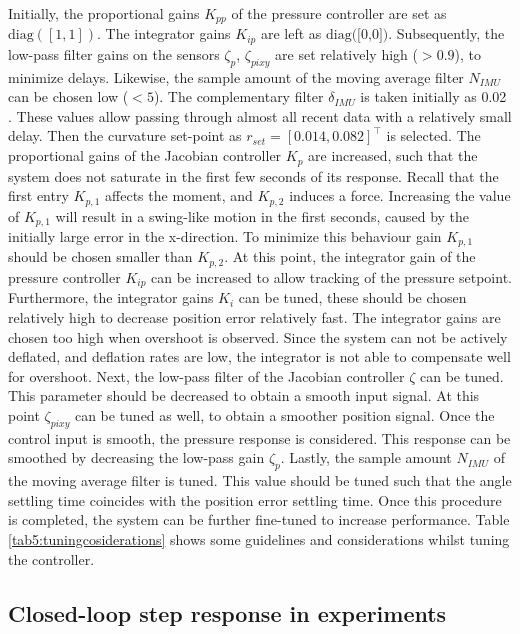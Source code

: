 Initially, the proportional gains $K_{pp}$ of the pressure controller are set as $\text{diag}([1,1])$. The integrator gains $K_{ip}$ are left as $\text{diag([0,0])}$. Subsequently, the low-pass filter gains on the sensors $\zeta_p$, $\zeta_{pixy}$ are set relatively high ($>0.9$), to minimize delays. Likewise, the sample amount of the moving average filter $N_{IMU}$ can be chosen low ($<5$). The complementary filter $\delta_{IMU}$ is taken initially as 0.02 \cite{compfilter}. These values allow passing through almost all recent data with a relatively small delay. Then the curvature set-point as $r_{set} = [0.014,0.082]^\top$ is selected. The proportional gains of the Jacobian controller $K_p$ are increased, such that the system does not saturate in the first few seconds of its response. Recall that the first entry $K_{p,1}$ affects the moment, and $K_{p,2}$ induces a force. Increasing the value of $K_{p,1}$ will result in a swing-like motion in the first seconds, caused by the initially large error in the x-direction. To minimize this behaviour gain $K_{p,1}$ should be chosen smaller than $K_{p,2}$. At this point, the integrator gain of the pressure controller $K_{ip}$ can be increased to allow tracking of the pressure setpoint. Furthermore, the integrator gains $K_i$ can be tuned, these should be chosen relatively high to decrease position error relatively fast. The integrator gains are chosen too high when overshoot is observed. Since the system can not be actively deflated, and deflation rates are low, the integrator is not able to compensate well for overshoot. Next, the low-pass filter of the Jacobian controller $\zeta$ can be tuned. This parameter should be decreased to obtain a smooth input signal. At this point $\zeta_{pixy}$ can be tuned as well, to obtain a smoother position signal. Once the control input is smooth, the pressure response is considered. This response can be smoothed by decreasing the low-pass gain $\zeta_p$. Lastly, the sample amount $N_{IMU}$ of the moving average filter is tuned. This value should be tuned such that the angle settling time coincides with the position error settling time. Once this procedure is completed, the system can be further fine-tuned to increase performance. Table \ref{tab5:tuningcosiderations} shows some guidelines and considerations whilst tuning the controller.



\subsection*{Closed-loop step response in experiments}


